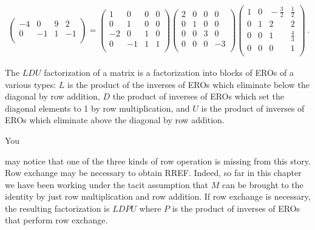 \begin{example}
\begin{eqnarray*}
\begin{pmatrix}
-4&0&9&2\\
0&-1&1&-1\\
\end{pmatrix}
=
\begin{pmatrix}
1&0&0&0\\
0&1&0&0\\
-2&0&1&0\\
0&-1&1&1\\
\end{pmatrix} 
\begin{pmatrix}
2&0&0&0\\
0&1&0&0\\
0&0&3&0\\
0&0&0&-3\\
\end{pmatrix} 
\begin{pmatrix}
1&0&\!\!-\frac{3}{2}&\frac{1}{2}\\
0&1&2&2\\
0&0&1&\frac43\\
0&0&0&1\\
\end{pmatrix}\, .
\end{eqnarray*}
\end{example}

The $LDU$ factorization of a matrix is a factorization into blocks of EROs of a various types: $L$ is the product of the inverses of EROs which eliminate below the diagonal by row addition, $D$ the product of inverses of EROs which set the diagonal elements to 1 by row multiplication, and $U$ is the product of inverses of EROs which eliminate above the diagonal by row addition.

\hypertarget{LDPU}{
You} may notice that one of the three kinds of row operation is missing from this story. 
Row exchange may  be necessary to obtain RREF. Indeed, 
so far in this chapter we have been working under the tacit assumption that 
$M$ can be brought to the identity by just row multiplication and row addition. 
If row exchange is necessary, the resulting factorization is $LDPU$ where $P$ is the product of inverses of EROs that perform row exchange. 

